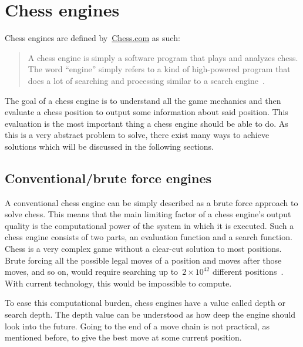 \section{Chess engines}\label{sec:chess-engines}

Chess engines are defined by~\url{Chess.com} as such:

\begin{quote}
    A chess engine is simply a software program that plays and analyzes chess.
    The word “engine” simply refers to a kind of high-powered program that does a
    lot of searching and processing similar to a search engine~\cite{chess-com-chess-engines}.
\end{quote}

The goal of a chess engine is to understand all the game mechanics and then evaluate a chess position to output some
information about said position.
This evaluation is the most important thing a chess engine should be able to do.
As this is a very abstract problem to solve, there exist many ways to achieve solutions which will be discussed in
the following sections.



\subsection{Conventional/brute force engines}\label{subsec:conventional-engines}

A conventional chess engine can be simply described as a brute force approach to solve chess.
This means that the main limiting factor of a chess engine's output quality is the computational power of the system in
which it is executed.
Such a chess engine consists of two parts, an evaluation function and a search function.
Chess is a very complex game without a clear-cut solution to most positions.
Brute forcing all the possible legal moves of a position and moves after those moves, and so on, would require searching
up to~\( 2 \times 10^{42} \) different positions~\cite{steinerberger2014}.
With current technology, this would be impossible to compute.

To ease this computational burden, chess engines have a value called depth or search depth.
The depth value can be understood as how deep the engine should look into the future.
Going to the end of a move chain is not practical, as mentioned before, to give the best move at some current position.

